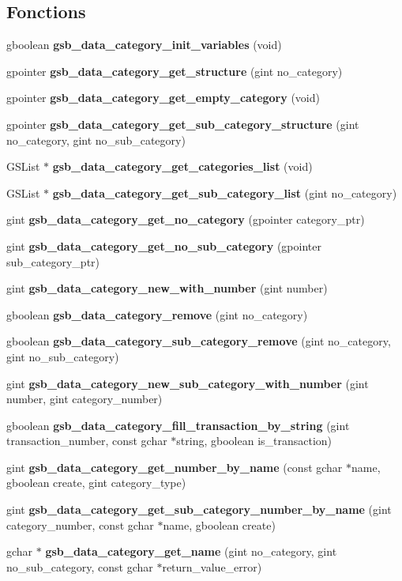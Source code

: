 \subsection*{Fonctions}
\begin{DoxyCompactItemize}
\item 
gboolean {\bf gsb\_\-data\_\-category\_\-init\_\-variables} (void)
\item 
gpointer {\bf gsb\_\-data\_\-category\_\-get\_\-structure} (gint no\_\-category)
\item 
gpointer {\bf gsb\_\-data\_\-category\_\-get\_\-empty\_\-category} (void)
\item 
gpointer {\bf gsb\_\-data\_\-category\_\-get\_\-sub\_\-category\_\-structure} (gint no\_\-category, gint no\_\-sub\_\-category)
\item 
GSList $\ast$ {\bf gsb\_\-data\_\-category\_\-get\_\-categories\_\-list} (void)
\item 
GSList $\ast$ {\bf gsb\_\-data\_\-category\_\-get\_\-sub\_\-category\_\-list} (gint no\_\-category)
\item 
gint {\bf gsb\_\-data\_\-category\_\-get\_\-no\_\-category} (gpointer category\_\-ptr)
\item 
gint {\bf gsb\_\-data\_\-category\_\-get\_\-no\_\-sub\_\-category} (gpointer sub\_\-category\_\-ptr)
\item 
gint {\bf gsb\_\-data\_\-category\_\-new\_\-with\_\-number} (gint number)
\item 
gboolean {\bf gsb\_\-data\_\-category\_\-remove} (gint no\_\-category)
\item 
gboolean {\bf gsb\_\-data\_\-category\_\-sub\_\-category\_\-remove} (gint no\_\-category, gint no\_\-sub\_\-category)
\item 
gint {\bf gsb\_\-data\_\-category\_\-new\_\-sub\_\-category\_\-with\_\-number} (gint number, gint category\_\-number)
\item 
gboolean {\bf gsb\_\-data\_\-category\_\-fill\_\-transaction\_\-by\_\-string} (gint transaction\_\-number, const gchar $\ast$string, gboolean is\_\-transaction)
\item 
gint {\bf gsb\_\-data\_\-category\_\-get\_\-number\_\-by\_\-name} (const gchar $\ast$name, gboolean create, gint category\_\-type)
\item 
gint {\bf gsb\_\-data\_\-category\_\-get\_\-sub\_\-category\_\-number\_\-by\_\-name} (gint category\_\-number, const gchar $\ast$name, gboolean create)
\item 
gchar $\ast$ {\bf gsb\_\-data\_\-category\_\-get\_\-name} (gint no\_\-category, gint no\_\-sub\_\-category, const gchar $\ast$return\_\-value\_\-error)

\end{DoxyCompactItemize}
